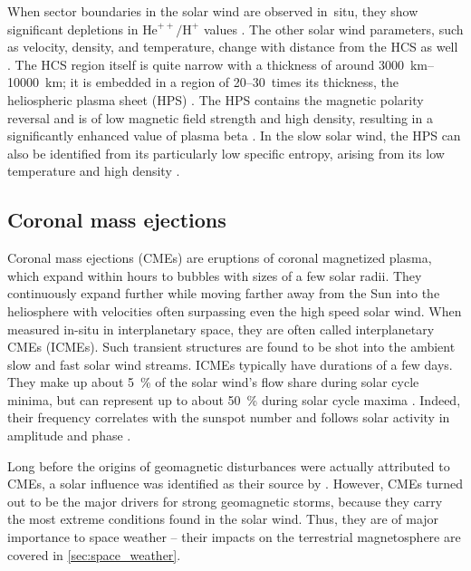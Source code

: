 When sector boundaries in the solar wind are observed in~situ, they show significant depletions in $\text{He}^{++}\!/\text{H}^+$ values \citep{Borrini1981}. The other solar wind parameters, such as velocity, density, and temperature, change with distance from the HCS as well \citep{Smith2001}. The HCS region itself is quite narrow with a thickness of around \SIrange{3000}{10000}{\km}; it is embedded in a region of 20--30~times its thickness, the heliospheric plasma sheet (HPS) \citep{Winterhalter1994}. The HPS contains the magnetic polarity reversal and is of low magnetic field strength and high density, resulting in a significantly enhanced value of plasma beta \citep{Crooker2004}. In the slow solar wind, the HPS can also be identified from its particularly low specific entropy, arising from its low temperature and high density \citep{Kilpua2016}.


\subsection{Coronal mass ejections}
\label{sec:coronal_mass_ejections}
Coronal mass ejections (CMEs) are eruptions of coronal magnetized plasma, which expand within hours to bubbles with sizes of a few solar radii. They continuously expand further while moving farther away from the Sun into the heliosphere with velocities often surpassing even the high speed solar wind. When measured in-situ in interplanetary space, they are often called interplanetary CMEs (ICMEs). Such transient structures are found to be shot into the ambient slow and fast solar wind streams. ICMEs typically have durations of a few days. They make up about \SI{5}{\percent} of the solar wind's flow share during solar cycle minima, but can represent up to about \SI{50}{\percent} during solar cycle maxima \citep{Richardson2012}. Indeed, their frequency correlates with the sunspot number \citep{Hildner1976} and follows solar activity in amplitude and phase \citep{Webb1991}.

Long before the origins of geomagnetic disturbances were actually attributed to CMEs, a solar influence was identified as their source by \citet{Carrington1859}. However, CMEs turned out to be the major drivers for strong geomagnetic storms, because they carry the most extreme conditions found in the solar wind. Thus, they are of major importance to space weather -- their impacts on the terrestrial magnetosphere are covered in \autoref{sec:space_weather}.

